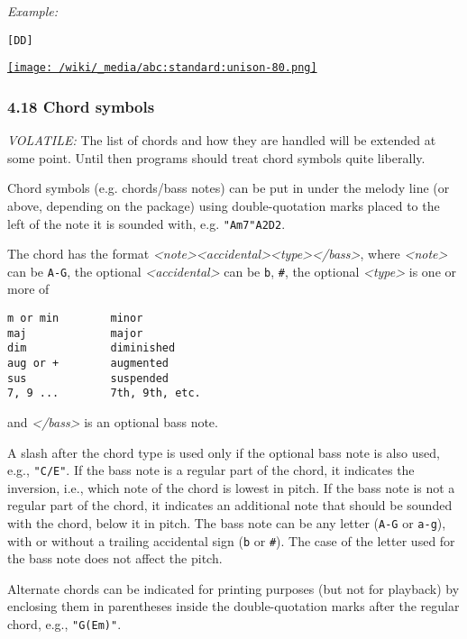 \emph{Example:}

\begin{verbatim}
[DD]
\end{verbatim}

\href{/wiki/_detail/abc:standard:unison-80.png?id=abc\%3Astandard\%3Av2.1}{\texttt{[image: /wiki/\_media/abc:standard:unison-80.png]}}

\hypertarget{chord_symbols}{\subsubsection{4.18 Chord
symbols}\label{chord_symbols}}

\emph{VOLATILE:} The list of chords and how they are handled will be
extended at some point. Until then programs should treat chord symbols
quite liberally.

Chord symbols (e.g. chords/bass notes) can be put in under the melody
line (or above, depending on the package) using double-quotation marks
placed to the left of the note it is sounded with, e.g.
\texttt{"Am7"A2D2}.

The chord has the format
\emph{\textless{}note\textgreater{}\textless{}accidental\textgreater{}\textless{}type\textgreater{}\textless{}/bass\textgreater{}},
where \emph{\textless{}note\textgreater{}} can be \texttt{A-G}, the
optional \emph{\textless{}accidental\textgreater{}} can be \texttt{b},
\texttt{\#}, the optional \emph{\textless{}type\textgreater{}} is one or
more of

\begin{verbatim}
m or min        minor
maj             major
dim             diminished
aug or +        augmented
sus             suspended
7, 9 ...        7th, 9th, etc.
\end{verbatim}

and \emph{\textless{}/bass\textgreater{}} is an optional bass note.

A slash after the chord type is used only if the optional bass note is
also used, e.g., \texttt{"C/E"}. If the bass note is a regular part of
the chord, it indicates the inversion, i.e., which note of the chord is
lowest in pitch. If the bass note is not a regular part of the chord, it
indicates an additional note that should be sounded with the chord,
below it in pitch. The bass note can be any letter (\texttt{A-G} or
\texttt{a-g}), with or without a trailing accidental sign (\texttt{b} or
\texttt{\#}). The case of the letter used for the bass note does not
affect the pitch.

Alternate chords can be indicated for printing purposes (but not for
playback) by enclosing them in parentheses inside the double-quotation
marks after the regular chord, e.g., \texttt{"G(Em)"}.

